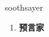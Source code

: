 
\begin{frame}
{\huge soothsayer}
\begin{center}
\begin{enumerate}\Large
  \item \textbf{预言家}
\end{enumerate}
\end{center}
\end{frame}
